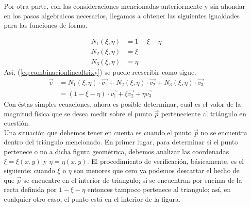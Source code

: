 Por otra parte, con las consideraciones mencionadas anteriormente y sin ahondar en los pasos algebraicos necesarios, llegamos a obtener las siguientes igualdades para las funciones de forma.

\begin{equation}
  \label{eq:fftridechieta}
  \begin{split}
    N_1(\xi,\eta) & = 1 - \xi - \eta \\
    N_2(\xi,\eta) & = \xi            \\
    N_3(\xi,\eta) & = \eta           
  \end{split}
\end{equation}
Así, (\ref{eq:combinacionlinealtrixy}) se puede reescribir como sigue.
\begin{equation}
  \label{eq:combinacionlinealtrichieta}  
  \begin{split}
    \vec{v} & = 
    N_{1}(\xi,\eta) \cdot \vec{v_1} + N_{2}(\xi,\eta) \cdot \vec{v_2}
    + N_{3}(\xi,\eta) \cdot \vec{v_3} \\
    & = (1-\xi-\eta) \cdot \vec{v_1} + \xi\vec{v_2} + \eta\vec{v_3}
    \end{split}
\end{equation}
Con éstas simples ecuaciones, ahora es posible determinar, cuál es el valor de la magnitud física que se desea medir sobre el punto $\vec{p}$ perteneciente al triángulo en cuestión.
\\
Una situación que debemos tener en cuenta es cuando el punto $\vec{p}$ no se encuentra dentro del triángulo mencionado. En primer lugar, para determinar si el punto pertenece o no a dicha figura geométrica, debemos analizar las coordenadas $\xi= \xi(x,y)$ y $\eta= \eta(x,y)$. El procedimiento de verificación, básicamente, es el siguiente: cuando $\xi$ o $\eta$ son menores que cero ya podemos descartar el hecho de que $\vec{p}$ se encuentre en el interior de triangulo; si se encuentran por encima de la recta definida por $1-\xi-\eta$ entonces tampoco pertenece al triangulo; así, en cualquier otro caso, el punto está en el interior de la figura. 

